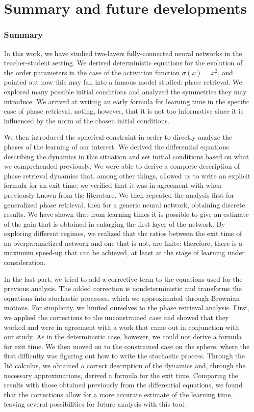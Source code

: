 \chapter{Summary and future developments}
\subsection*{Summary}
In this work, we have studied two-layers fully-connected neural networks in the teacher-student setting.
We derived deterministic equations for the evolution of the order parameters in the case of the activation function \(\sigma(x)=x^2\),
and pointed out how this may fall into a famous model studied: phase retrieval.
We explored many possible initial conditions and analyzed the symmetries they may introduce.
We arrived at writing an early formula for learning time in the specific case of phase retrieval, noting,
however, that it is not too informative since it is influenced by the norm of the chosen initial conditions.

We then introduced the spherical constraint in order to directly analyze the phases of the learning of our interest.
We derived the differential equations describing the dynamics in this situation and set initial conditions based on what we comprehended previously.
We were able to derive a complete description of phase retrieval dynamics that, among other things,
allowed us to write an explicit formula for an exit time; we verified that it was in agreement with when previously known from the literature.
We then repeated the analysis first for generalized phase retrieval, then for a generic neural network, obtaining discrete results.
We have shown that from learning times it is possible to give an estimate of the gain that is obtained in enlarging the first layer of the network.
By exploring different regimes, we realized that the ratios between the exit time of an overparametized network and one that is not, are finite:
therefore, there is a maximum speed-up that can be achieved, at least at the stage of learning under consideration.

In the last part, we tried to add a corrective term to the equations used for the previous analysis. The added correction is nondeterministic and transforms the equations into stochastic processes, which we approximated through Brownian motions.
For simplicity, we limited ourselves to the phase retrieval analysis. 
First, we applied the corrections to the unconstrained case and showed that they worked and were in agreement with a work that came out in conjunction with our study.
As in the deterministic case, however, we could not derive a formula for exit time. We then moved on to the constrained case on the sphere, where the first difficulty was figuring out how to write the stochastic process.
Through the Itô calculus, we obtained a correct description of the dynamics and,
through the necessary approximations, derived a formula for the exit time.
Comparing the results with those obtained previously from the differential equations,
we found that the corrections allow for a more accurate estimate of the learning time,
leaving several possibilities for future analysis with this tool. 

